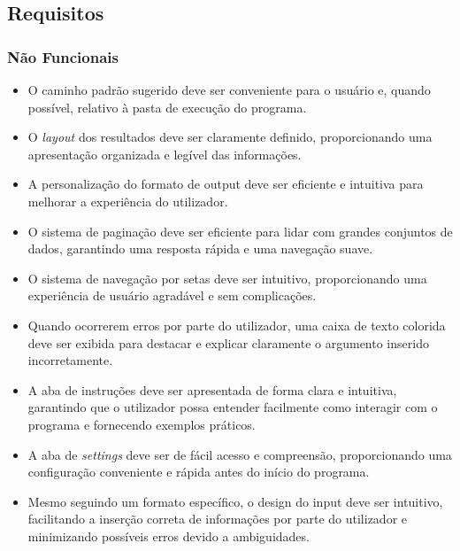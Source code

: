 \documentclass{article}
\begin{document}
\subsection{Requisitos}
\subsubsection{Não Funcionais}
\begin{itemize}
\item O caminho padrão sugerido deve ser conveniente para o usuário e, quando possível, relativo à pasta de execução do programa.
\item O \textit{layout} dos resultados deve ser claramente definido, proporcionando uma apresentação organizada e legível das informações.
\item A personalização do formato de output deve ser eficiente e intuitiva para melhorar a experiência do utilizador.
\item O sistema de paginação deve ser eficiente para lidar com grandes conjuntos de dados, garantindo uma resposta rápida e uma navegação suave.
\item O sistema de navegação por setas deve ser intuitivo, proporcionando uma experiência de usuário agradável e sem complicações.
\item Quando ocorrerem erros por parte do utilizador, uma caixa de texto colorida deve ser exibida para destacar e explicar claramente o argumento inserido incorretamente.
\item A aba de instruções deve ser apresentada de forma clara e intuitiva, garantindo que o utilizador possa entender facilmente como interagir com o programa e fornecendo exemplos práticos.
\item A aba de \textit{settings} deve ser de fácil acesso e compreensão, proporcionando uma configuração conveniente e rápida antes do início do programa.
\item Mesmo seguindo um formato específico, o design do input deve ser intuitivo, facilitando a inserção correta de informações por parte do utilizador e minimizando possíveis erros devido a ambiguidades.
\end{itemize}
\end{document}
